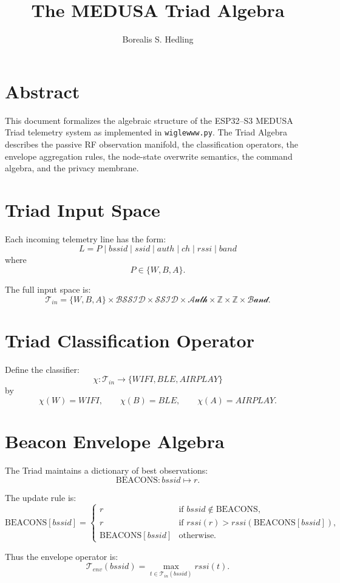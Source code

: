 \documentclass[11pt]{article}
\title{The MEDUSA Triad Algebra}
\author{Borealis S. Hedling}
\date{}
\begin{document}
\maketitle

\section*{Abstract}
This document formalizes the algebraic structure of the ESP32--S3 MEDUSA Triad
telemetry system as implemented in \texttt{wiglewww.py}. The Triad Algebra
describes the passive RF observation manifold, the classification operators,
the envelope aggregation rules, the node-state overwrite semantics, the
command algebra, and the privacy membrane.

\section{Triad Input Space}
Each incoming telemetry line has the form:
\[
L = P \mid bssid \mid ssid \mid auth \mid ch \mid rssi \mid band
\]
where
\[
P \in \{W, B, A\}.
\]

The full input space is:
\[
\mathcal{T}_{in}
= \{W,B,A\}
\times \mathcal{BSSID}
\times \mathcal{SSID}
\times \mathcal{Auth}
\times \mathbb{Z}
\times \mathbb{Z}
\times \mathcal{Band}.
\]

\section{Triad Classification Operator}
Define the classifier:
\[
\chi : \mathcal{T}_{in} \to \{WIFI, BLE, AIRPLAY\}
\]
by
\[
\chi(W)=WIFI,\qquad
\chi(B)=BLE,\qquad
\chi(A)=AIRPLAY.
\]

\section{Beacon Envelope Algebra}
The Triad maintains a dictionary of best observations:
\[
\text{BEACONS} : bssid \mapsto r.
\]

The update rule is:
\[
\text{BEACONS}[bssid] =
\begin{cases}
r & \text{if } bssid \notin \text{BEACONS},\\[6pt]
r & \text{if } rssi(r) > rssi(\text{BEACONS}[bssid]),\\[6pt]
\text{BEACONS}[bssid] & \text{otherwise}.
\end{cases}
\]

Thus the envelope operator is:
\[
\mathcal{T}_{env}(bssid)
= \max_{t \in \mathcal{T}_{in}(bssid)} rssi(t).
\]
\end{document}
